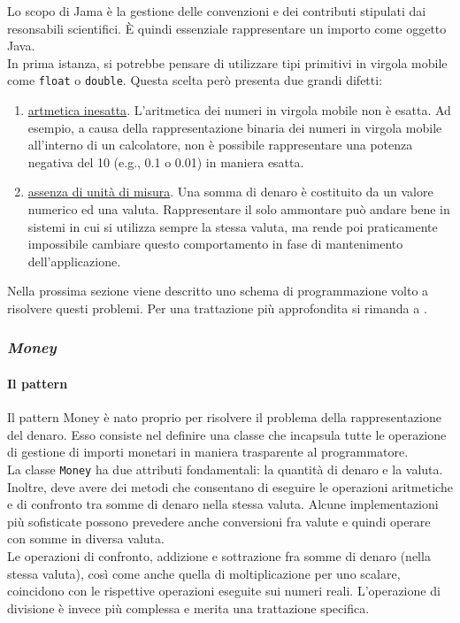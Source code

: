 Lo scopo di Jama è la gestione delle convenzioni e dei contributi stipulati dai resonsabili scientifici. È quindi essenziale rappresentare un importo come oggetto Java. \\
In prima istanza, si potrebbe pensare di utilizzare tipi primitivi in virgola mobile come \texttt{float} o \texttt{double}. Questa scelta però presenta due grandi difetti:
\begin{enumerate}
\item \underline{artmetica inesatta}. L'aritmetica dei numeri in virgola mobile non è esatta. Ad esempio, a causa della rappresentazione binaria dei numeri in virgola mobile all'interno di un calcolatore, non è possibile rappresentare una potenza negativa del 10 (e.g., 0.1 o 0.01) in maniera esatta.
\item \underline{assenza di unità di misura}. Una somma di denaro è costituito da un valore numerico ed una valuta. Rappresentare il solo ammontare può andare bene in sistemi in cui si utilizza sempre la stessa valuta, ma rende poi praticamente impossibile cambiare questo comportamento in fase di mantenimento dell'applicazione.
\end{enumerate}

Nella prossima sezione viene descritto uno schema di programmazione volto a risolvere questi problemi. Per una trattazione più approfondita si rimanda a \cite{pa}.

\subsubsection{\textsl{Money}}

\paragraph{Il pattern}
Il pattern Money è nato proprio per risolvere il problema della rappresentazione del denaro. Esso consiste nel definire una classe che incapsula tutte le operazione di gestione di importi monetari in maniera trasparente al programmatore. \\
La classe \lstinline{Money} ha due attributi fondamentali: la quantità di denaro e la valuta. Inoltre, deve avere dei metodi che consentano di eseguire le operazioni aritmetiche e di confronto tra somme di denaro nella stessa valuta. Alcune implementazioni più sofisticate possono prevedere anche conversioni fra valute e quindi operare con somme in diversa valuta.\\
Le operazioni di confronto, addizione e sottrazione fra somme di denaro (nella stessa valuta), così come anche quella di moltiplicazione per uno scalare, coincidono con le rispettive operazioni eseguite sui numeri reali. L'operazione di divisione è invece più complessa e merita una trattazione specifica. 

